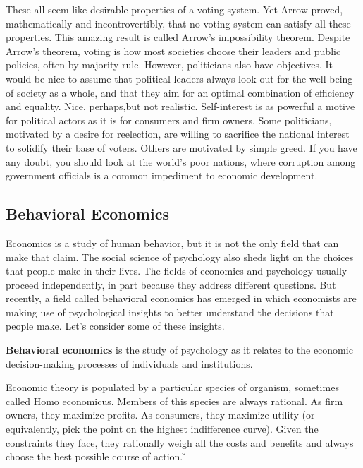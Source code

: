 These all seem like desirable properties of a voting system. Yet Arrow proved, mathematically and incontrovertibly,
that no voting system can satisfy all these properties. This amazing result is called Arrow's impossibility
theorem. Despite Arrow's theorem, voting is how most societies choose their leaders and public policies, often by
majority rule. However, politicians also have objectives. It would be nice to assume that political leaders always
look out for the well-being of society as a whole, and that they aim for an optimal combination of efficiency and
equality. Nice, perhaps,but not realistic. Self-interest is as powerful a motive for political actors as it is for
consumers and firm owners. Some politicians, motivated by a desire for reelection, are willing to sacrifice the
national interest to solidify their base of voters. Others are motivated by simple greed. If you have any doubt, you
should look at the world's poor nations, where corruption among government officials is a common impediment to
economic development.

\subsection{Behavioral Economics}

Economics is a study of human behavior, but it is not the only field that can make that claim. The social science of
psychology also sheds light on the choices that people make in their lives. The fields of economics and psychology
usually proceed independently, in part because they address different questions. But recently, a field called
behavioral economics has emerged in which economists are making use of psychological insights to better understand
the decisions that people make. Let's consider some of these insights.

\textbf{Behavioral economics} is the study of psychology as it relates to the economic decision-making processes of
individuals and institutions.
\ed

Economic theory is populated by a particular species of organism, sometimes called Homo economicus. Members of this
species are always rational. As firm owners, they maximize profits. As consumers, they maximize utility (or
equivalently, pick the point on the highest indifference curve). Given the constraints they face, they rationally
weigh all the costs and benefits and always choose the best possible course of action. \v

